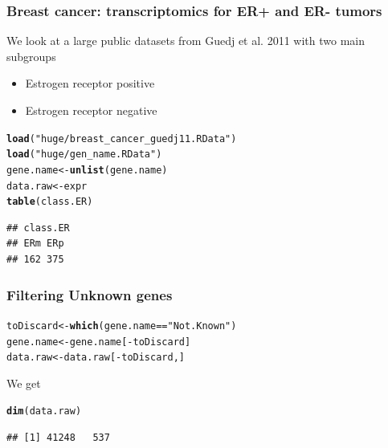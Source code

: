 \documentclass[10pt, c, xcolor=x11names]{beamer}\usepackage[]{graphicx}\usepackage[]{color}
\makeatletter
\newcommand{\hlstr}[1]{\textcolor[rgb]{0.192,0.494,0.8}{#1}}%
\newcommand{\hlopt}[1]{\textcolor[rgb]{0,0,0}{#1}}%
\newcommand{\hlstd}[1]{\textcolor[rgb]{0.345,0.345,0.345}{#1}}%
\newcommand{\hlkwb}[1]{\textcolor[rgb]{0.69,0.353,0.396}{#1}}%
\newcommand{\hlkwd}[1]{\textcolor[rgb]{0.737,0.353,0.396}{\textbf{#1}}}%
\newenvironment{kframe}{%
 \def\at@end@of@kframe{}%
 \ifinner\ifhmode%
  \def\at@end@of@kframe{\end{minipage}}%
  \begin{minipage}{\columnwidth}%
 \fi\fi%
 \def\FrameCommand##1{\hskip\@totalleftmargin \hskip-\fboxsep
 \colorbox{shadecolor}{##1}\hskip-\fboxsep
     \hskip-\linewidth \hskip-\@totalleftmargin \hskip\columnwidth}%
 \MakeFramed {\advance\hsize-\width
   \@totalleftmargin\z@ \linewidth\hsize
   \@setminipage}}%
 {\par\unskip\endMakeFramed%
 \at@end@of@kframe}
\newenvironment{knitrout}{}{} %
\makeatother
\begin{document}
\begin{frame}[fragile]
  \frametitle{Breast cancer: transcriptomics for ER+ and ER- tumors}

We look at a large public datasets from Guedj et al. 2011 with two main subgroups
  \begin{itemize}
  \item Estrogen receptor positive
  \item Estrogen receptor negative
  \end{itemize}

\begin{knitrout}\scriptsize
{}\color{fgcolor}\begin{kframe}
\begin{alltt}
\hlkwd{load} \hlstd{(}\hlstr{"huge/breast_cancer_guedj11.RData"}\hlstd{)}
\hlkwd{load} \hlstd{(}\hlstr{"huge/gen_name.RData"}\hlstd{)}
\hlstd{gene.name} \hlkwb{<-} \hlkwd{unlist}\hlstd{(gene.name)}
\hlstd{data.raw} \hlkwb{<-} \hlstd{expr}
\hlkwd{table}\hlstd{(class.ER)}
\end{alltt}
\begin{verbatim}
## class.ER
## ERm ERp 
## 162 375
\end{verbatim}
\end{kframe}
\end{knitrout}

\end{frame}

\begin{frame}[fragile]
  \frametitle{Filtering Unknown genes}

\begin{knitrout}\scriptsize
{}\color{fgcolor}\begin{kframe}
\begin{alltt}
\hlstd{toDiscard} \hlkwb{<-} \hlkwd{which}\hlstd{(gene.name} \hlopt{==} \hlstr{"Not.Known"}\hlstd{)}
\hlstd{gene.name} \hlkwb{<-} \hlstd{gene.name[}\hlopt{-}\hlstd{toDiscard]}
\hlstd{data.raw} \hlkwb{<-} \hlstd{data.raw[}\hlopt{-}\hlstd{toDiscard, ]}
\end{alltt}
\end{kframe}
\end{knitrout}

We get

\begin{knitrout}\scriptsize
{}\color{fgcolor}\begin{kframe}
\begin{alltt}
\hlkwd{dim}\hlstd{(data.raw)}
\end{alltt}
\begin{verbatim}
## [1] 41248   537
\end{verbatim}
\end{kframe}
\end{knitrout}

\end{frame}
\end{document}
